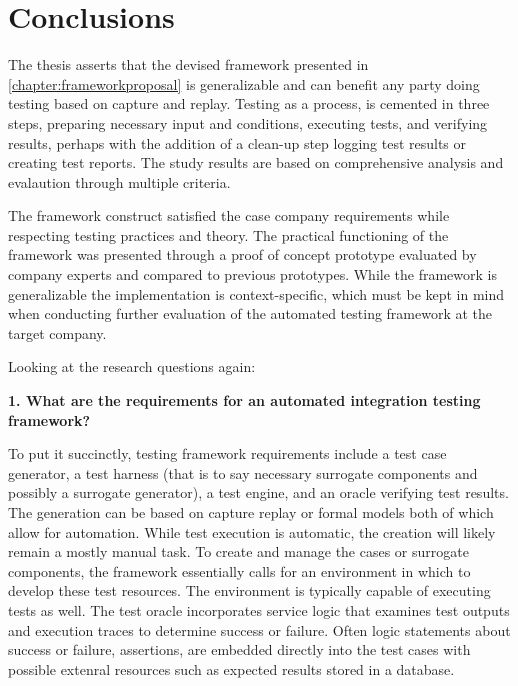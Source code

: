 \documentclass[12pt,a4paper,oneside,pdftex]{report}
\begin{document}
{\chapter{Conclusions}
\label{chapter:conclusions}
The thesis asserts that the devised framework presented in \ref{chapter:frameworkproposal} is generalizable and can benefit any party doing testing based on capture and replay. Testing as a process, is cemented in three steps, preparing necessary input and conditions, executing tests, and verifying results, perhaps with the addition of a clean-up step logging test results or creating test reports. The study results are based on comprehensive analysis and evalaution through multiple criteria.

The framework construct satisfied the case company requirements while respecting testing practices and theory. The practical functioning of the framework was presented through a proof of concept prototype evaluated by company experts and compared to previous prototypes. While the framework is generalizable the implementation is context-specific, which must be kept in mind when conducting further evaluation of the automated testing framework at the target company.

Looking at the research questions again: \\

\begin{adjustwidth}{2.5em}{0pt}
\textbf{1. What are the requirements for an automated integration testing framework?} \\
\end{adjustwidth}

To put it succinctly, testing framework requirements include a test case generator, a test harness (that is to say necessary surrogate components and possibly a surrogate generator), a test engine, and an oracle verifying test results. The generation can be based on capture replay or formal models both of which allow for automation. While test execution is automatic, the creation will likely remain a mostly manual task. To create and manage the cases or surrogate components, the framework essentially calls for an environment in which to develop these test resources. The environment is typically capable of executing tests as well. The test oracle incorporates service logic that examines test outputs and execution traces to determine success or failure. Often logic statements about success or failure, assertions, are embedded directly into the test cases with possible extenral resources such as expected results stored in a database. 

}
\end{document}

